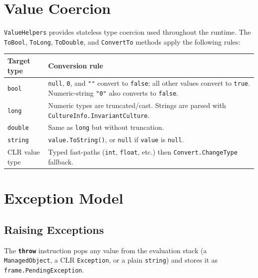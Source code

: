 \documentclass[11pt,a4paper]{article}
\newcommand{\code}[1]{\texttt{\small #1}}
\newcommand{\typename}[1]{\textcolor{typecolor}{\texttt{\small #1}}}
\newcommand{\opcode}[1]{\textbf{\texttt{#1}}}
\begin{document}
\section{Value Coercion}
\label{sec:coerce}

\typename{ValueHelpers} provides stateless type coercion used throughout the
runtime. The \code{ToBool}, \code{ToLong}, \code{ToDouble}, and \code{ConvertTo}
methods apply the following rules:

\begin{longtable}{lp{9.5cm}}
  \toprule
  \textbf{Target type} & \textbf{Conversion rule} \\
  \midrule
  \endhead
  \texttt{bool}   & \texttt{null}, \texttt{0}, and \texttt{""} convert to
                    \texttt{false}; all other values convert to \texttt{true}.
                    Numeric-string \texttt{"0"} also converts to \texttt{false}. \\
  \texttt{long}   & Numeric types are truncated/cast. Strings are parsed with
                    \code{CultureInfo.InvariantCulture}. \\
  \texttt{double} & Same as \texttt{long} but without truncation. \\
  \texttt{string} & \code{value.ToString()}, or \texttt{null} if \code{value}
                    is \texttt{null}. \\
  CLR value type  & Typed fast-paths (\texttt{int}, \texttt{float}, etc.) then
                    \code{Convert.ChangeType} fallback. \\
  \bottomrule
\end{longtable}

\section{Exception Model}
\label{sec:exceptions}

\subsection{Raising Exceptions}

The \opcode{throw} instruction pops any value from the evaluation stack
(a \typename{ManagedObject}, a CLR \typename{Exception}, or a plain
\texttt{string}) and stores it as \code{frame.PendingException}.
\end{document}

